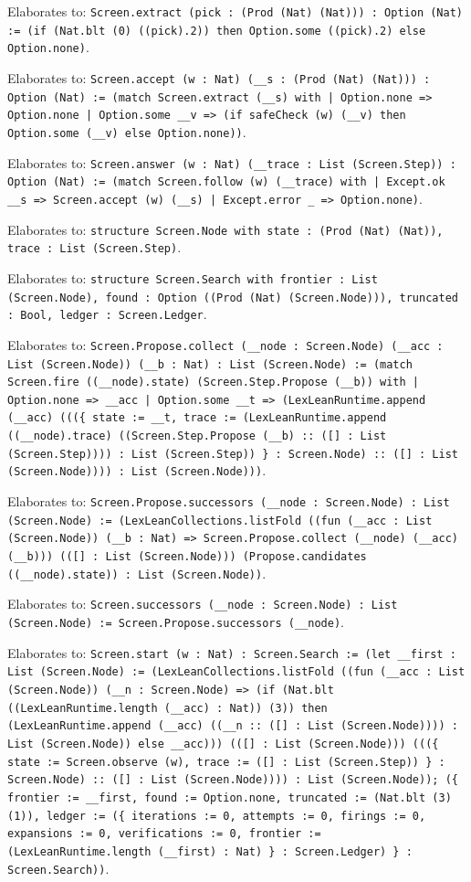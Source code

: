 \documentclass[11pt]{article}
\begin{document}
\noindent Elaborates to: \texttt{Screen.extract (pick : (Prod (Nat) (Nat))) : Option (Nat) := (if (Nat.blt (0) ((pick).2)) then Option.some ((pick).2) else Option.none)}.\par
\noindent Elaborates to: \texttt{Screen.accept (w : Nat) (\_\_s : (Prod (Nat) (Nat))) : Option (Nat) := (match Screen.extract (\_\_s) with | Option.none => Option.none | Option.some \_\_v => (if safeCheck (w) (\_\_v) then Option.some (\_\_v) else Option.none))}.\par
\noindent Elaborates to: \texttt{Screen.answer (w : Nat) (\_\_trace : List (Screen.Step)) : Option (Nat) := (match Screen.follow (w) (\_\_trace) with | Except.ok \_\_s => Screen.accept (w) (\_\_s) | Except.error \_ => Option.none)}.\par
\noindent Elaborates to: \texttt{structure Screen.Node with state : (Prod (Nat) (Nat)), trace : List (Screen.Step)}.\par
\noindent Elaborates to: \texttt{structure Screen.Search with frontier : List (Screen.Node), found : Option ((Prod (Nat) (Screen.Node))), truncated : Bool, ledger : Screen.Ledger}.\par
\noindent Elaborates to: \texttt{Screen.Propose.collect (\_\_node : Screen.Node) (\_\_acc : List (Screen.Node)) (\_\_b : Nat) : List (Screen.Node) := (match Screen.fire ((\_\_node).state) (Screen.Step.Propose (\_\_b)) with | Option.none => \_\_acc | Option.some \_\_t => (LexLeanRuntime.append (\_\_acc) (((\{ state := \_\_t, trace := (LexLeanRuntime.append ((\_\_node).trace) ((Screen.Step.Propose (\_\_b) :: ([] : List (Screen.Step)))) : List (Screen.Step)) \} : Screen.Node) :: ([] : List (Screen.Node)))) : List (Screen.Node)))}.\par
\noindent Elaborates to: \texttt{Screen.Propose.successors (\_\_node : Screen.Node) : List (Screen.Node) := (LexLeanCollections.listFold ((fun (\_\_acc : List (Screen.Node)) (\_\_b : Nat) => Screen.Propose.collect (\_\_node) (\_\_acc) (\_\_b))) (([] : List (Screen.Node))) (Propose.candidates ((\_\_node).state)) : List (Screen.Node))}.\par
\noindent Elaborates to: \texttt{Screen.successors (\_\_node : Screen.Node) : List (Screen.Node) := Screen.Propose.successors (\_\_node)}.\par
\noindent Elaborates to: \texttt{Screen.start (w : Nat) : Screen.Search := (let \_\_first : List (Screen.Node) := (LexLeanCollections.listFold ((fun (\_\_acc : List (Screen.Node)) (\_\_n : Screen.Node) => (if (Nat.blt ((LexLeanRuntime.length (\_\_acc) : Nat)) (3)) then (LexLeanRuntime.append (\_\_acc) ((\_\_n :: ([] : List (Screen.Node)))) : List (Screen.Node)) else \_\_acc))) (([] : List (Screen.Node))) (((\{ state := Screen.observe (w), trace := ([] : List (Screen.Step)) \} : Screen.Node) :: ([] : List (Screen.Node)))) : List (Screen.Node)); (\{ frontier := \_\_first, found := Option.none, truncated := (Nat.blt (3) (1)), ledger := (\{ iterations := 0, attempts := 0, firings := 0, expansions := 0, verifications := 0, frontier := (LexLeanRuntime.length (\_\_first) : Nat) \} : Screen.Ledger) \} : Screen.Search))}.\par
\end{document}
